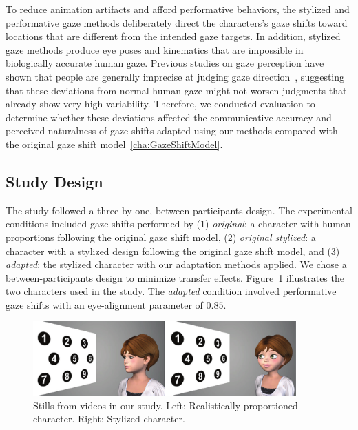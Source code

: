 To reduce animation artifacts and afford performative behaviors, the stylized and performative gaze methods deliberately direct the characters's gaze shifts toward locations that are different from the intended gaze targets. In addition, stylized gaze methods produce eye poses and kinematics that are impossible in biologically accurate human gaze. Previous studies on gaze perception have shown that people are generally imprecise at judging gaze direction~\cite{argyle1976gaze}, suggesting that these deviations from normal human gaze might not worsen judgments that already show very high variability. Therefore, we conducted evaluation to determine whether these deviations affected the communicative accuracy and perceived naturalness of gaze shifts adapted using our methods compared with the original gaze shift model~\ref{cha:GazeShiftModel}.

\subsection{Study Design}

The study followed a three-by-one, between-participants design. The experimental conditions included gaze shifts performed by (1) \textit{original}: a character with human proportions following the original gaze shift model, (2) \textit{original stylized}: a character with a stylized design following the original gaze shift model, and (3) \textit{adapted}: the stylized character with our adaptation methods applied. We chose a between-participants design to minimize transfer effects. Figure~\ref{fig:StudyTask} illustrates the two characters used in the study. The \textit{adapted} condition involved performative gaze shifts with an eye-alignment parameter of $0.85$.

\begin{figure}
\centering
\includegraphics[width=0.9\textwidth]{stylizedgaze/Figures/StudyTask-small.pdf}
\caption{Stills from videos in our study. Left: Realistically-proportioned character. Right: Stylized character.}
\vspace{-12pt}
\label{fig:StudyTask}
\end{figure}

